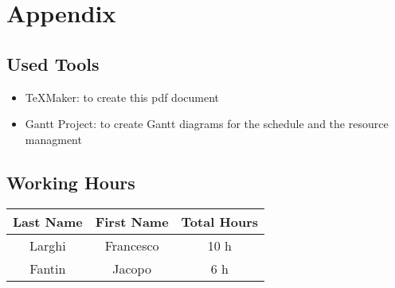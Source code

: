 \chapter{Appendix}


\section{Used Tools}

\begin{itemize}
	\item TeXMaker: to create this pdf document
	\item Gantt Project: to create Gantt diagrams for the schedule and the resource managment
\end{itemize}

\section{Working Hours}

\begin{table}[htbp]
\begin{center}
\begin{tabular}[t]{ccc}

\hline
\textbf{Last Name} & \textbf{First Name} & \textbf{Total Hours} \\
\hline
Larghi & Francesco &  10 h\\
\hline
Fantin & Jacopo &  6 h\\
\hline

\end{tabular}
\end{center}
\end{table}

